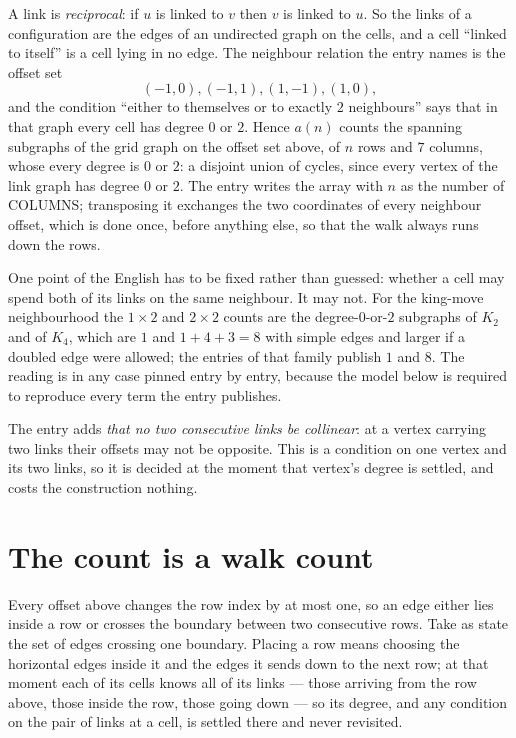 \documentclass[11pt,a4paper]{article}
\theoremstyle{plain}
\theoremstyle{definition}
\begin{document}
A link is \emph{reciprocal}: if $u$ is linked to $v$ then $v$ is linked to $u$. So the links
of a configuration are the edges of an undirected graph on the cells, and a cell ``linked to
itself'' is a cell lying in no edge. The neighbour relation the entry names is the offset set
\[
(-1,0), (-1,1), (1,-1), (1,0),
\]
and the condition ``either to themselves or to exactly $2$ neighbours'' says that in that
graph every cell has degree $0$ or $2$. Hence $a(n)$ counts the spanning subgraphs of the
grid graph on the offset set above, of $n$ rows and $7$ columns,
whose every degree is $0$ or $2$: a disjoint union of cycles, since every vertex of the link graph has degree $0$ or $2$. The entry writes the array with $n$ as the number of COLUMNS; transposing it exchanges the two coordinates of every neighbour offset, which is done once, before anything else, so that the walk always runs down the rows.

One point of the English has to be fixed rather than guessed: whether a cell may spend both of
its links on the same neighbour. It may not. For the king-move neighbourhood the $1\times2$
and $2\times2$ counts are the degree-$0$-or-$2$ subgraphs of $K_2$ and of $K_4$, which are $1$
and $1+4+3=8$ with simple edges and larger if a doubled edge were allowed; the entries of that
family publish $1$ and $8$. The reading is in any case pinned entry by entry, because the
model below is required to reproduce every term the entry publishes.

The entry adds \emph{that no two consecutive links be collinear}: at a vertex carrying two
links their offsets may not be opposite. This is a condition on one vertex and its two links,
so it is decided at the moment that vertex's degree is settled, and costs the construction
nothing.

\section{The count is a walk count}

Every offset above changes the row index by at most one, so an edge either lies inside a row
or crosses the boundary between two consecutive rows. Take as state the set of edges crossing
one boundary. Placing a row means choosing the horizontal edges inside it and the edges it
sends down to the next row; at that moment each of its cells knows all of its links --- those
arriving from the row above, those inside the row, those going down --- so its degree, and any
condition on the pair of links at a cell, is settled there and never revisited.
\end{document}
